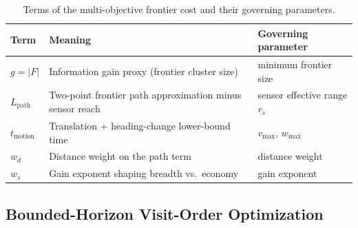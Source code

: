 \begin{table}[htbp]
  \centering
  \caption{Terms of the multi-objective frontier cost and their governing
  parameters.}
  \label{tab:cost-terms}
  \begin{tabularx}{\textwidth}{l X l}
    \toprule
    \textbf{Term} & \textbf{Meaning} & \textbf{Governing parameter} \\
    \midrule
    $g=\lvert F\rvert$ & Information gain proxy (frontier cluster size) & minimum frontier size \\
    $L_{\mathrm{path}}$ & Two-point frontier path approximation minus sensor reach & sensor effective range $r_s$ \\
    $t_{\mathrm{motion}}$ & Translation $+$ heading-change lower-bound time & $v_{\max}$, $w_{\max}$ \\
    $w_d$ & Distance weight on the path term & distance weight \\
    $w_s$ & Gain exponent shaping breadth vs.\ economy & gain exponent \\
    \bottomrule
  \end{tabularx}
\end{table}

\subsection{Bounded-Horizon Visit-Order Optimization}
\label{subsec:visit-order}

